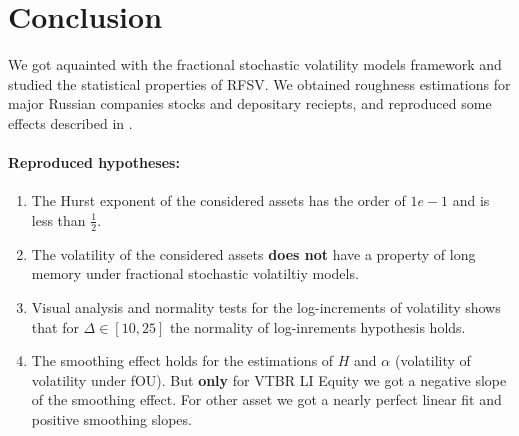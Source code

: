 \section{Conclusion}
    We got aquainted with the fractional stochastic volatility models framework and
    studied the statistical properties of RFSV. 
    We obtained roughness estimations for major Russian companies stocks and depositary 
    reciepts, and reproduced some effects described in \cite{GatheralRosenbaum2014}.

    \paragraph*{Reproduced hypotheses:}
    \begin{enumerate}
        \item The Hurst exponent of the considered assets has the order of $1e-1$ and is less than $\frac{1}{2}$.
        \item The volatility of the considered assets \textbf{does not} have a property of long memory under fractional stochastic 
                volatiltiy models.
        \item Visual analysis and normality tests for the log-increments of volatility shows that for 
              $\Delta \in [10, 25]$ the normality of log-inrements hypothesis holds.
        \item The smoothing effect holds for the estimations of $H$ and $\alpha$ (volatility of volatility under fOU). 
              But \textbf{only} for  VTBR LI Equity we got a negative slope of the smoothing effect. For other
              asset we got a nearly perfect linear fit and positive smoothing slopes.
    \end{enumerate}